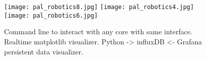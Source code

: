         \begin{figure}
         \begin{center}
            \texttt{[image: pal\_robotics8.jpg]}
            \texttt{[image: pal\_robotics4.jpg]}
            \texttt{[image: pal\_robotics6.jpg]}
         \end{center}
           \caption{Command line to interact with any core with same interface. Realtime matplotlib visualizer. Python -> influxDB <- Grafana persistent data visualizer. }
         \label{fig:novo_space}
      \end{figure}
\fi
